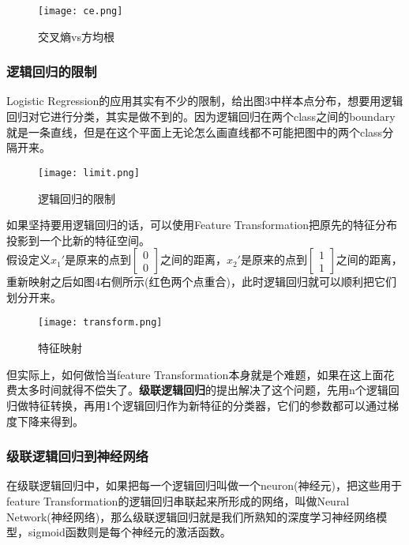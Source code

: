 \begin{figure}[H]
    \centering
    \texttt{[image: ce.png]}
    \caption{交叉熵vs方均根}
    \label{fig:ce}
\end{figure}

\subsubsection{逻辑回归的限制}

Logistic Regression的应用其实有不少的限制，给出图3中样本点分布，想要用逻辑回归对它进行分类，其实是做不到的。因为逻辑回归在两个class之间的boundary就是一条直线，但是在这个平面上无论怎么画直线都不可能把图中的两个class分隔开来。

\begin{figure}[H]
    \centering
    \texttt{[image: limit.png]}
    \caption{逻辑回归的限制}
    \label{fig:limit}
\end{figure}

如果坚持要用逻辑回归的话，可以使用Feature Transformation把原先的特征分布投影到一个比新的特征空间。\\

假设定义$x_1'$是原来的点到$\begin{bmatrix}0\\0 \end{bmatrix}$之间的距离，$x_2'$是原来的点到$\begin{bmatrix}1\\ 1 \end{bmatrix}$之间的距离，重新映射之后如图4右侧所示(红色两个点重合)，此时逻辑回归就可以顺利把它们划分开来。

\begin{figure}[H]
    \centering
    \texttt{[image: transform.png]}
    \caption{特征映射}
    \label{fig:transform}
\end{figure}

但实际上，如何做恰当feature Transformation本身就是个难题，如果在这上面花费太多时间就得不偿失了。\textbf{级联逻辑回归}的提出解决了这个问题，先用n个逻辑回归做特征转换，再用1个逻辑回归作为新特征的分类器，它们的参数都可以通过梯度下降来得到。

\subsubsection{级联逻辑回归到神经网络}
在级联逻辑回归中，如果把每一个逻辑回归叫做一个neuron(神经元)，把这些用于feature Transformation的逻辑回归串联起来所形成的网络，叫做Neural Network(神经网络)，那么级联逻辑回归就是我们所熟知的深度学习神经网络模型，sigmoid函数则是每个神经元的激活函数。

